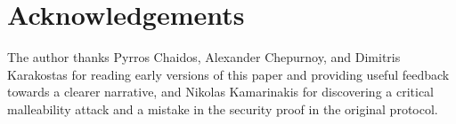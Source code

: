 \section{Acknowledgements}

The author thanks Pyrros Chaidos, Alexander Chepurnoy, and Dimitris Karakostas for reading early versions of this
paper and providing useful feedback towards a clearer narrative, and Nikolas Kamarinakis for discovering a critical
malleability attack and a mistake in the security proof in the original protocol.
